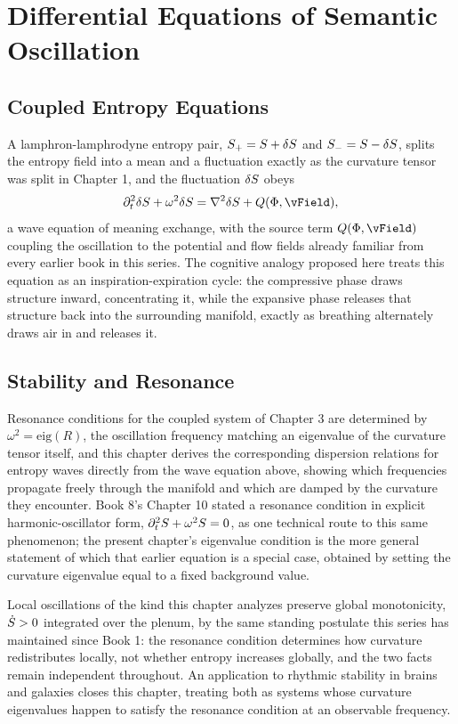 \part{Differential Equations of Semantic Oscillation}

\chapter{Coupled Entropy Equations}

A lamphron-lamphrodyne entropy pair, $S_+ = S + \delta S$ and $S_- = S - \delta S$, splits the entropy field into a mean and a fluctuation exactly as the curvature tensor was split in Chapter 1, and the fluctuation $\delta S$ obeys
\[
\partial_t^2 \delta\SEntropy + \omega^2 \delta\SEntropy = \nabla^2 \delta\SEntropy + Q(\PhiField, \vField),
\]
a wave equation of meaning exchange, with the source term $Q(\PhiField, \vField)$ coupling the oscillation to the potential and flow fields already familiar from every earlier book in this series. The cognitive analogy proposed here treats this equation as an inspiration-expiration cycle: the compressive phase draws structure inward, concentrating it, while the expansive phase releases that structure back into the surrounding manifold, exactly as breathing alternately draws air in and releases it.

\chapter{Stability and Resonance}

Resonance conditions for the coupled system of Chapter 3 are determined by $\omega^2 = \text{eig}(R)$, the oscillation frequency matching an eigenvalue of the curvature tensor itself, and this chapter derives the corresponding dispersion relations for entropy waves directly from the wave equation above, showing which frequencies propagate freely through the manifold and which are damped by the curvature they encounter. Book 8's Chapter 10 stated a resonance condition in explicit harmonic-oscillator form, $\partial_t^2 S + \omega^2 S = 0$, as one technical route to this same phenomenon; the present chapter's eigenvalue condition is the more general statement of which that earlier equation is a special case, obtained by setting the curvature eigenvalue equal to a fixed background value.

Local oscillations of the kind this chapter analyzes preserve global monotonicity, $\dot{S} > 0$ integrated over the plenum, by the same standing postulate this series has maintained since Book 1: the resonance condition determines how curvature redistributes locally, not whether entropy increases globally, and the two facts remain independent throughout. An application to rhythmic stability in brains and galaxies closes this chapter, treating both as systems whose curvature eigenvalues happen to satisfy the resonance condition at an observable frequency.

